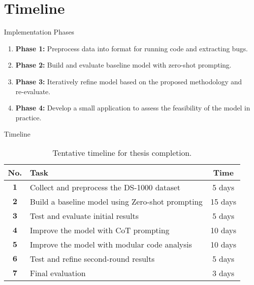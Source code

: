 \section{Timeline}

\begin{frame}{Implementation Phases}
    \begin{enumerate}
        \item \textbf{Phase 1:} Preprocess data into format for running code and extracting bugs.

        \item \textbf{Phase 2:} Build and evaluate baseline model with zero-shot prompting.

        \item \textbf{Phase 3:} Iteratively refine model based on the proposed methodology and re-evaluate.

        \item \textbf{Phase 4:} Develop a small application to assess the feasibility of the model in practice.
    \end{enumerate}
\end{frame}

\begin{frame}{Timeline}
    \begin{table}[!htb]
        \captionsetup{font=small,labelformat=empty}
        \caption{Tentative timeline for thesis completion.}
        \begin{center}
            \begin{tabular}{clc}
                \hline
                No.          & Task                                             & Time    \\
                \hline\hline
                $\mathbf{1}$ & Collect and preprocess the DS-1000 dataset       & 5 days  \\
                \hline
                $\mathbf{2}$ & Build a baseline model using Zero-shot prompting & 15 days \\
                \hline
                $\mathbf{3}$ & Test and evaluate initial results                & 5 days  \\
                \hline
                $\mathbf{4}$ & Improve the model with CoT prompting             & 10 days \\
                \hline
                $\mathbf{5}$ & Improve the model with modular code analysis     & 10 days \\
                \hline
                $\mathbf{6}$ & Test and refine second-round results             & 5 days  \\
                \hline
                $\mathbf{7}$ & Final evaluation                                 & 3 days  \\
                \hline
            \end{tabular}
        \end{center}
    \end{table}
\end{frame}
